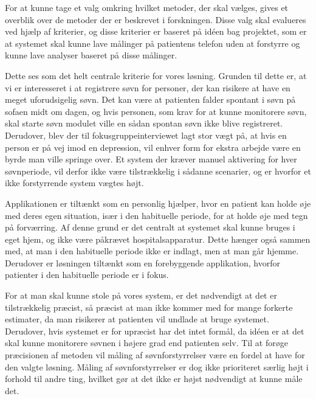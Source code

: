 For at kunne tage et valg omkring hvilket metoder, der skal vælges, gives et overblik over de metoder der er beskrevet i forskningen.
Disse valg skal evalueres ved hjælp af kriterier, og disse kriterier er baseret på idéen bag projektet, som er at systemet skal kunne lave målinger på patientens telefon uden at forstyrre og kunne lave analyser baseret på disse målinger. 

\begin{description}[style=nextline]
\item[Kriterie \#1: Undgå bruger intervention og måle søvn uden at forstyrre]
Dette ses som det helt centrale kriterie for vores løsning.
Grunden til dette er, at vi er interesseret i at registrere søvn for personer, der kan risikere at have en meget uforudsigelig søvn. 
Det kan være at patienten falder spontant i søvn på sofaen midt om dagen, og hvis personen, som krav for at kunne monitorere søvn, skal starte søvn modulet ville en sådan spontan søvn ikke blive registreret.
Derudover, blev der til fokusgruppeinterviewet \citep[Kapitel 1, Sektion 5]{misc:faellesrapp} lagt stor vægt på, at hvis en person er på vej imod en depression, vil enhver form for ekstra arbejde være en byrde man ville springe over.
Et system der kræver manuel aktivering for hver søvnperiode, vil derfor ikke være tilstrækkelig i sådanne scenarier, og er hvorfor et ikke forstyrrende system vægtes højt.

\item[Kriterie \#2: Kunne bruges af brugere i deres eget hjem]
Applikationen er tiltænkt som en personlig hjælper, hvor en patient kan holde øje med deres egen situation, især i den habituelle periode, for at holde øje med tegn på forværring.
Af denne grund er det centralt at systemet skal kunne bruges i eget hjem, og ikke være påkrævet hospitalsapparatur.
Dette hænger også sammen med, at man i den habituelle periode ikke er indlagt, men at man går hjemme.
Derudover er løsningen tiltænkt som en forebyggende applikation, hvorfor patienter i den habituelle periode er i fokus.

\item[Kriterie \#3: Være præcis]
For at man skal kunne stole på vores system, er det nødvendigt at det er tilstrækkelig præcist, så præcist at man ikke kommer med for mange forkerte estimater, da man risikerer at patienten vil undlade at bruge systemet. 
Derudover, hvis systemet er for upræcist har det intet formål, da idéen er at det skal kunne monitorere søvnen i højere grad end patienten selv.
Til at forøge præcisionen af metoden vil måling af søvnforstyrrelser være en fordel at have for den valgte løsning.
Måling af søvnforstyrrelser er dog ikke prioriteret særlig højt i forhold til andre ting, hvilket gør at det ikke er højst nødvendigt at kunne måle det.
\end{description}

